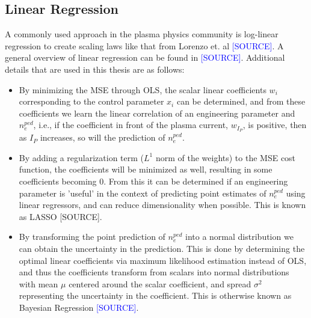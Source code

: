 \documentclass[a4paper, twoside, final, 12pt]{article}
\begin{document}
\subsection{Linear Regression}
A commonly used approach in the plasma physics community is log-linear regression to create scaling laws like that from Lorenzo et. al \textcolor{blue}{[SOURCE]}.
A general overview of linear regression can be found in \textcolor{blue}{[SOURCE]}. 
Additional details that are used in this thesis are as follows: 
\begin{itemize}
	\item By minimizing the MSE through OLS, the scalar linear coefficients $w_i$ corresponding to the control parameter $x_i$ can be determined, and from these coefficients we learn the linear correlation of an engineering parameter and $n_e^{ped}$, i.e., if the coefficient in front of the plasma current, $w_{I_P}$, is positive, then as $I_P$ increases, so will the prediction of $n_e^{ped}$.
	\item By adding a regularization term ($L^1$ norm of the weights) to the MSE cost function, the coefficients will be minimized as well, resulting in some coefficients becoming 0. From this it can be determined if an engineering parameter is 'useful' in the context of predicting point estimates of $n_e^{ped}$ using linear regressors, and can reduce dimensionality when possible. This is known as LASSO [SOURCE].
	\item By transforming the point prediction of $n_e^{ped}$  into a normal distribution we can obtain the uncertainty in the prediction. This is done by determining the optimal linear coefficients via maximum likelihood estimation instead of OLS, and thus the coefficients transform from scalars into normal distributions with mean $\mu$ centered around the scalar coefficient, and spread $\sigma^2$ representing the uncertainty in the coefficient. This is otherwise known as Bayesian Regression \textcolor{blue}{[SOURCE]}.
\end{itemize}
\end{document}

